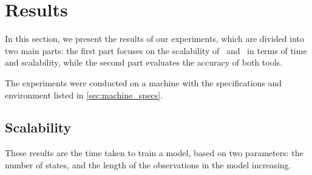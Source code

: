 \section{Results}\label{sec:results}
In this section, we present the results of our experiments, which are divided into two main parts: the first part focuses on the scalability of \Jajapy\ and \Cupaal\ in terms of time and scalability, while the second part evaluates the accuracy of both tools.

The experiments were conducted on a machine with the specifications and environment listed in \autoref{sec:machine_specs}.


\subsection{Scalability}\label{subsec:scalability}
These results are the time taken to train a model, based on two parameters: the number of states, and the length of the observations in the model increasing.


